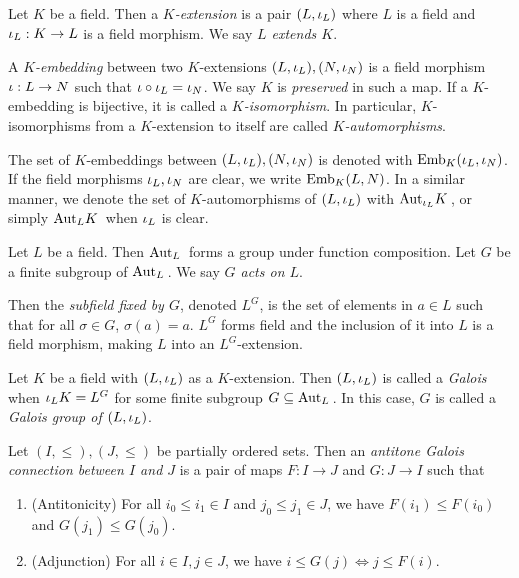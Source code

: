 \documentclass[main.tex]{subfiles}
\begin{document}
\begin{dfn}  
  
  Let $K$ be a field. 
  Then a \emph{$K$-extension} is a pair $(L,\io_L)$
  where $L$ is a field and $\io_L : K \to L$ is a field morphism. 
  We say \emph{$L$ extends $K$}. 

  A \emph{$K$-embedding} between 
  two $K$-extensions $(L,\io_L), (N,\io_N)$ is 
  a field morphism $\io : L \to N$ such that $\io \circ \io_L = \io_N$.
  We say $K$ is \emph{preserved} in such a map.
  If a $K$-embedding is bijective, 
  it is called a \emph{$K$-isomorphism}. 
  In particular, 
  $K$-isomorphisms from a $K$-extension to itself are 
  called \emph{$K$-automorphisms}. 

  The set of $K$-embeddings between $(L,\io_L), (N,\io_N)$ is 
  denoted with $\emb{K}{\io_L}{\io_N}$. 
  If the field morphisms $\io_L, \io_N$ are clear, 
  we write $\emb{K}{L}{N}$. 
  In a similar manner, 
  we denote the set of $K$-automorphisms of $(L,\io_L)$ with 
  $\aut{K}{\io_L}$, or simply $\aut{K}{L}$ when $\io_L$ is clear. 

\end{dfn}

\begin{dfn}
  
  Let $L$ be a field. 
  Then $\aut{}{L}$ forms a group under function composition. 
  Let $G$ be a finite subgroup of $\aut{}{L}$.
  We say \emph{$G$ acts on $L$}. 

  Then the \emph{subfield fixed by $G$}, denoted $L^G$, 
  is the set of elements in $a \in L$ such that 
  for all $\sigma \in G$, $\sigma (a) = a$. 
  $L^G$ forms field and the inclusion of it into $L$ is a field morphism, 
  making $L$ into an $L^G$-extension. 

  Let $K$ be a field with $(L,\io_L)$ as a $K$-extension. 
  Then $(L,\io_L)$ is called a \emph{Galois} when 
  $\io_L K = L^G$ for some finite subgroup $G \subseteq \aut{}{L}$. 
  In this case, $G$ is called a \emph{Galois group of $(L,\io_L)$}. 
\end{dfn}

\begin{dfn} 

  Let $(I,\leq), (J, \leq)$ be partially ordered sets. 
  Then an \emph{antitone Galois connection between $I$ and $J$} is 
  a pair of maps $F : I \to J$ and $G : J \to I$ such that
  \begin{enumerate}
    \item (Antitonicity) 
    For all $i_0 \leq i_1 \in I$ and $j_0 \leq j_1 \in J$, 
    we have $F(i_1) \leq F(i_0)$ and $G(j_1) \leq G(j_0)$. 
    \item (Adjunction) For all $i \in I, j \in J$, 
    we have $i \leq G(j) \iff j \leq F(i)$. 
  \end{enumerate}
\end{dfn}
\end{document}
